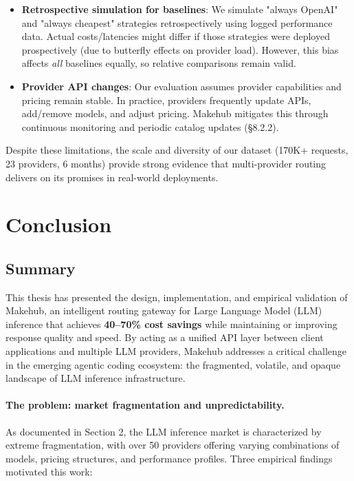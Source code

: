 \documentclass[english]{article}
\begin{document}
\begin{itemize}
\item \textbf{Retrospective simulation for baselines}: We simulate "always OpenAI" and "always cheapest" strategies retrospectively using logged performance data. Actual costs/latencies might differ if those strategies were deployed prospectively (due to butterfly effects on provider load). However, this bias affects \emph{all} baselines equally, so relative comparisons remain valid.

\item \textbf{Provider API changes}: Our evaluation assumes provider capabilities and pricing remain stable. In practice, providers frequently update APIs, add/remove models, and adjust pricing. Makehub mitigates this through continuous monitoring and periodic catalog updates (§8.2.2).
\end{itemize}

Despite these limitations, the scale and diversity of our dataset (170K+ requests, 23 providers, 6 months) provide strong evidence that multi-provider routing delivers on its promises in real-world deployments.


\newpage
\section{Conclusion}

\subsection{Summary}

This thesis has presented the design, implementation, and empirical validation of Makehub, an intelligent routing gateway for Large Language Model (LLM) inference that achieves \textbf{40--70\% cost savings} while maintaining or improving response quality and speed. By acting as a unified API layer between client applications and multiple LLM providers, Makehub addresses a critical challenge in the emerging agentic coding ecosystem: the fragmented, volatile, and opaque landscape of LLM inference infrastructure.

\paragraph{The problem: market fragmentation and unpredictability.}

As documented in Section 2, the LLM inference market is characterized by extreme fragmentation, with over 50 providers offering varying combinations of models, pricing structures, and performance profiles. Three empirical findings motivated this work:
\end{document}
